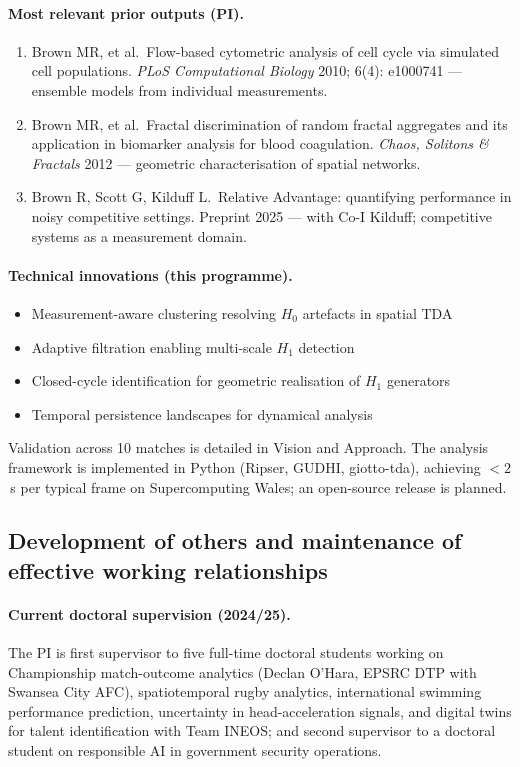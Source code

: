 \paragraph{Most relevant prior outputs (PI).}
\begin{enumerate}
  \item Brown MR, et al.\ Flow-based cytometric analysis of cell cycle via simulated cell populations. \emph{PLoS Computational Biology} 2010; 6(4): e1000741 --- ensemble models from individual measurements.
  \item Brown MR, et al.\ Fractal discrimination of random fractal aggregates and its application in biomarker analysis for blood coagulation. \emph{Chaos, Solitons \& Fractals} 2012 --- geometric characterisation of spatial networks.
  \item Brown R, Scott G, Kilduff L.\ Relative Advantage: quantifying performance in noisy competitive settings. Preprint 2025 --- with Co-I Kilduff; competitive systems as a measurement domain.
\end{enumerate}

\paragraph{Technical innovations (this programme).}
\begin{itemize}
  \item Measurement-aware clustering resolving $H_0$ artefacts in spatial TDA
  \item Adaptive filtration enabling multi-scale $H_1$ detection
  \item Closed-cycle identification for geometric realisation of $H_1$ generators
  \item Temporal persistence landscapes for dynamical analysis
\end{itemize}

Validation across 10 matches is detailed in Vision and Approach. The analysis framework is implemented in Python (Ripser, GUDHI, giotto-tda), achieving ${<}2$\,s per typical frame on Supercomputing Wales; an open-source release is planned.

\subsection{Development of others and maintenance of effective working relationships}

\paragraph{Current doctoral supervision (2024/25).}
The PI is first supervisor to five full-time doctoral students working on Championship match-outcome analytics (Declan O'Hara, EPSRC DTP with Swansea City AFC), spatiotemporal rugby analytics, international swimming performance prediction, uncertainty in head-acceleration signals, and digital twins for talent identification with Team INEOS; and second supervisor to a doctoral student on responsible AI in government security operations.

